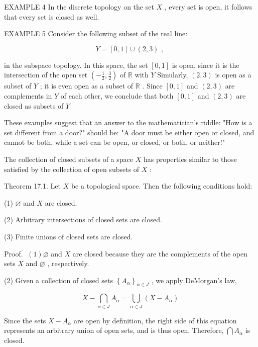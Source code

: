 \documentclass[10pt]{article}
\begin{document}
EXAMPLE 4 In the discrete topology on the set \(X\) , every set is open, it follows that every set is closed as well.

EXAMPLE 5 Consider the following subset of the real line:

\[
Y = \left\lbrack  {0,1}\right\rbrack   \cup  \left( {2,3}\right) \text{ , }
\]

in the subspace topology. In this space, the set \(\left\lbrack  {0,1}\right\rbrack\) is open, since it is the intersection of the open set \(\left( {-\frac{1}{2},\frac{3}{2}}\right)\) of \(\mathbb{R}\) with \(Y\) Simularly, \(\left( {2,3}\right)\) is open as a subset of \(Y\) ; it is even open as a subset of \(\mathbb{R}\) . Since \(\left\lbrack  {0,1}\right\rbrack\) and \(\left( {2,3}\right)\) are complements in \(Y\) of each other, we conclude that both \(\left\lbrack  {0,1}\right\rbrack\) and \(\left( {2,3}\right)\) are closed as subsets of \(Y\)

These examples suggest that an answer to the mathematician's riddle: "How is a set different from a door?" should be: "A door must be either open or closed, and cannot be both, while a set can be open, or closed, or both, or neither!"

The collection of closed subsets of a space \(X\) has properties similar to those satisfied by the collection of open subsets of \(X\) :

Theorem 17.1. Let \(X\) be a topological space. Then the following conditions hold:

(1) \(\varnothing\) and \(X\) are closed.

(2) Arbitrary intersections of closed sets are closed.

(3) Finite unions of closed sets are closed.

Proof. \(\;\left( 1\right) \varnothing\) and \(X\) are closed because they are the complements of the open sets \(X\) and \(\varnothing\) , respectively.

(2) Given a collection of closed sets \({\left\{  {A}_{\alpha }\right\}  }_{\alpha  \in  J}\) , we apply DeMorgan’s law,

\[
X - \mathop{\bigcap }\limits_{{\alpha  \in  J}}{A}_{\alpha } = \mathop{\bigcup }\limits_{{\alpha  \in  J}}\left( {X - {A}_{\alpha }}\right)
\]

Since the sets \(X - {A}_{\alpha }\) are open by definition, the right side of this equation represents an arbitrary union of open sets, and is thus open. Therefore, \(\bigcap {A}_{\alpha }\) is closed.
\end{document}
